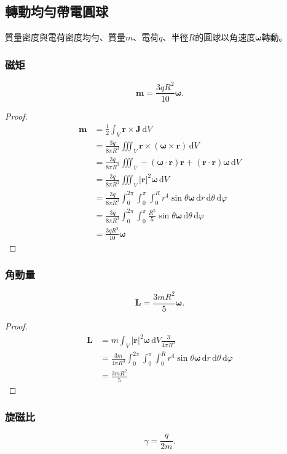 \documentclass[a4paper,12pt]{report}
\begin{document}
\begin{itemize}
\subsection{轉動均勻帶電圓球}
質量密度與電荷密度均勻、質量$m$、電荷$q$、半徑$R$的圓球以角速度$\boldsymbol{\omega}$轉動。
\subsubsection{磁矩}
\[\mathbf{m}=\frac{3qR^2}{10}\boldsymbol{\omega}.\]
\begin{proof}
\[\begin{aligned}
\mathbf{m}&=\frac{1}{2}\int_V \mathbf{r}\times\mathbf{J}\,\mathrm{d}V\\
&=\frac{3q}{8\pi R^3}\iiint_V\mathbf{r}\times(\boldsymbol{\omega}\times\mathbf{r})\,\mathrm{d}V\\
&=\frac{3q}{8\pi R^3}\iiint_V-(\boldsymbol{\omega}\cdot\mathbf{r})\mathbf{r}+(\mathbf{r}\cdot\mathbf{r})\boldsymbol{\omega}\,\mathrm{d}V\\
&=\frac{3q}{8\pi R^3}\iiint_V|\mathbf{r}|^2\boldsymbol{\omega}\,\mathrm{d}V\\
&=\frac{3q}{8\pi R^3}\int_0^{2\pi}\int_0^{\pi}\int_0^Rr^4\sin\theta\boldsymbol{\omega}\,\mathrm{d}r\,\mathrm{d}\theta\,\mathrm{d}\varphi\\
&=\frac{3q}{8\pi R^3}\int_0^{2\pi}\int_0^{\pi}\frac{R^5}{5}\sin\theta\boldsymbol{\omega}\,\mathrm{d}\theta\,\mathrm{d}\varphi\\
&=\frac{3qR^2}{10}\boldsymbol{\omega}
\end{aligned}\]
\end{proof}
\subsubsection{角動量}
\[\mathbf{L}=\frac{3mR^2}{5}\boldsymbol{\omega}.\]
\begin{proof}
\[\begin{aligned}
\mathbf{L}&=m\int_V|\mathbf{r}|^2\boldsymbol{\omega}\,\mathrm{d}V\frac{3}{4\pi R^3}\\
&=\frac{3m}{4\pi R^3}\int_0^{2\pi}\int_0^{\pi}\int_0^Rr^4\sin\theta\boldsymbol{\omega}\,\mathrm{d}r\,\mathrm{d}\theta\,\mathrm{d}\varphi\\
&=\frac{3mR^2}{5}
\end{aligned}\]
\end{proof}
\subsubsection{旋磁比}
\[\gamma=\frac{q}{2m}.\]

\end{itemize}
\end{document}
